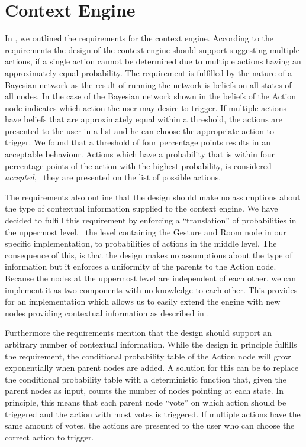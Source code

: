 \section{Context Engine}
\label{sec:design:context-engine}

In , we outlined the requirements for the context engine. According to the requirements the design of the context engine should support suggesting multiple actions, if a single action cannot be determined due to multiple actions having an approximately equal probability. The requirement is fulfilled by the nature of a Bayesian network as the result of running the network is beliefs on all states of all nodes. In the case of the Bayesian network shown in  the beliefs of the Action node indicates which action the user may desire to trigger.
If multiple actions have beliefs that are approximately equal within a threshold, the actions are presented to the user in a list and he can choose the appropriate action to trigger. We found that a threshold of four percentage points results in an acceptable behaviour. Actions which have a probability that is within four percentage points of the action with the highest probability, is considered \emph{accepted}, \ie~they are presented on the list of possible actions.

The requirements also outline that the design should make no assumptions about the type of contextual information supplied to the context engine. We have decided to fulfill this requirement by enforcing a ``translation'' of probabilities in the uppermost level, \ie~the level containing the Gesture and Room node in our specific implementation, to probabilities of actions in the middle level.
The consequence of this, is that the design makes no assumptions about the type of information but it enforces a uniformity of the parents to the Action node.
Because the nodes at the uppermost level are independent of each other, we can implement it as two components with no knowledge to each other. This provides for an implementation which allows us to easily extend the engine with new nodes providing contextual information as described in .

Furthermore the requirements mention that the design should support an arbitrary number of contextual information. While the design in principle fulfills the requirement, the conditional probability table of the Action node will grow exponentially when parent nodes are added.
A solution for this can be to replace the conditional probability table with a deterministic function that, given the parent nodes as input, counts the number of nodes pointing at each state. In principle, this means that each parent node ``vote'' on which action should be triggered and the action with most votes is triggered. If multiple actions have the same amount of votes, the actions are presented to the user who can choose the correct action to trigger.

